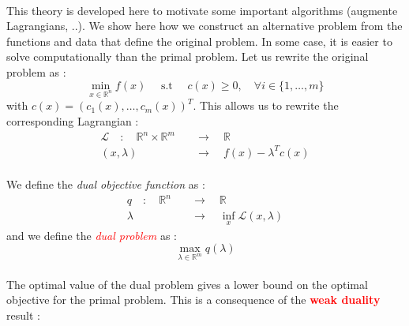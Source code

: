 \documentclass[a4paper]{article}
\begin{document}
{{		\paragraph{} This theory is developed here to motivate some important algorithms (augmente Lagrangians, ..). \newline
		We show here how we construct an alternative problem from the functions and data that define the original problem. In some case, it is easier to solve computationally than the primal problem. Let us rewrite the original problem as : 
		\begin{equation}
			\min_{x\in\mathbb{R}^n} f(x) \quad  \text{ s.t } \quad c(x)\geq 0, \quad \forall{i}\in\{1,\hdots,m\}
		\end{equation}
		with $c(x) = (c_1(x), \hdots, c_m(x))^T$. 
		This allows us to rewrite the corresponding Lagrangian : 
		\begin{equation}
			\begin{aligned}
					\mathcal{L} \quad : \quad \mathbb{R}^n \times \mathbb{R}^m \quad &\to \quad \mathbb{R}\\
					(x,\lambda) \quad &\to \quad f(x) - \lambda^Tc(x)
			\end{aligned}
		\end{equation}
		
		\paragraph{} We define the \emph{dual objective function} as : 
		\begin{equation}
			\begin{aligned}
					q \quad : \quad \mathbb{R}^n \quad &\to \quad \mathbb{R}\\
						\lambda \quad &\to \quad \inf_{x}\mathcal{L}(x,\lambda)
			\end{aligned}
		\end{equation}
		and we define the \textcolor{red}{\emph{dual problem}} as : 
		\begin{equation}
			\max_{\lambda\in\mathbb{R}^m} q(\lambda)
		\end{equation}
		
		\paragraph{} The optimal value of the dual problem gives a lower bound on the optimal objective for the primal problem. This is a consequence of the \textbf{\textcolor{red}{weak duality}} result : 
		\vspace{10pt} 
		
}}
\end{document}
